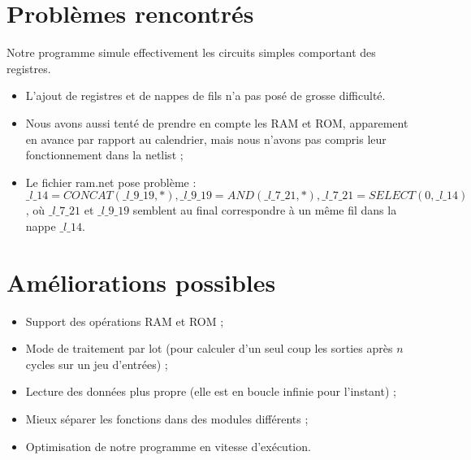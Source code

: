 \documentclass[a4paper]{article}
\begin{document}
\section{Problèmes rencontrés}

Notre programme simule effectivement les circuits
simples comportant des registres.
\begin{itemize}
    \item L'ajout de registres et de nappes de fils n'a pas posé de
grosse difficulté.
    \item Nous avons aussi tenté de prendre en compte les RAM et ROM,
apparement en avance par rapport au calendrier, mais nous n'avons pas
compris leur fonctionnement dans la netlist ;
    \item Le fichier ram.net pose problème : $\_l\_14 =
CONCAT(\_l\_9\_19,*), \_l\_9\_19 = AND(\_l\_7\_21,*), \_l\_7\_21 =
SELECT(0,\_l\_14)$, où $\_l\_7\_21$ et $\_l\_9\_19$ semblent au final
correspondre à un même fil dans la nappe $\_l\_14$.
\end{itemize}

\section{Améliorations possibles}

\begin{itemize}
    \item Support des opérations RAM et ROM ;
    \item Mode de traitement par lot (pour calculer d'un seul coup les sorties après $n$ cycles sur un jeu d'entrées) ;
    \item Lecture des données plus propre (elle est en boucle
infinie pour l'instant) ;
    \item Mieux séparer les fonctions dans des modules différents ;
    \item Optimisation de notre programme en vitesse d'exécution.
\end{itemize}

\end{document}
